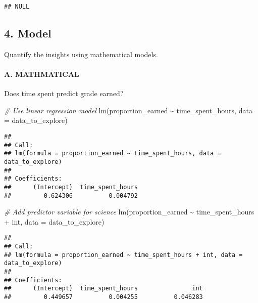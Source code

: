 \documentclass[
]{article}
\newenvironment{Shaded}{\begin{snugshade}}{\end{snugshade}}
\newcommand{\AttributeTok}[1]{\textcolor[rgb]{0.77,0.63,0.00}{#1}}
\newcommand{\CommentTok}[1]{\textcolor[rgb]{0.56,0.35,0.01}{\textit{#1}}}
\newcommand{\FunctionTok}[1]{\textcolor[rgb]{0.00,0.00,0.00}{#1}}
\newcommand{\NormalTok}[1]{#1}
\newcommand{\SpecialCharTok}[1]{\textcolor[rgb]{0.00,0.00,0.00}{#1}}
\begin{document}
\begin{verbatim}
## NULL
\end{verbatim}

\hypertarget{model}{%
\subsection{4. Model}\label{model}}

Quantify the insights using mathematical models.

\hypertarget{a.-mathmatical}{%
\paragraph{A. MATHMATICAL}\label{a.-mathmatical}}

Does time spent predict grade earned?

\begin{Shaded}
\begin{Highlighting}[]
\CommentTok{\# Use linear regression model}
\FunctionTok{lm}\NormalTok{(proportion\_earned }\SpecialCharTok{\textasciitilde{}}\NormalTok{ time\_spent\_hours, }
   \AttributeTok{data =}\NormalTok{ data\_to\_explore)}
\end{Highlighting}
\end{Shaded}

\begin{verbatim}
## 
## Call:
## lm(formula = proportion_earned ~ time_spent_hours, data = data_to_explore)
## 
## Coefficients:
##      (Intercept)  time_spent_hours  
##         0.624306          0.004792
\end{verbatim}

\begin{Shaded}
\begin{Highlighting}[]
\CommentTok{\# Add predictor variable for science}
\FunctionTok{lm}\NormalTok{(proportion\_earned }\SpecialCharTok{\textasciitilde{}}\NormalTok{ time\_spent\_hours }\SpecialCharTok{+}\NormalTok{ int, }
   \AttributeTok{data =}\NormalTok{ data\_to\_explore)}
\end{Highlighting}
\end{Shaded}

\begin{verbatim}
## 
## Call:
## lm(formula = proportion_earned ~ time_spent_hours + int, data = data_to_explore)
## 
## Coefficients:
##      (Intercept)  time_spent_hours               int  
##         0.449657          0.004255          0.046283
\end{verbatim}
\end{document}

